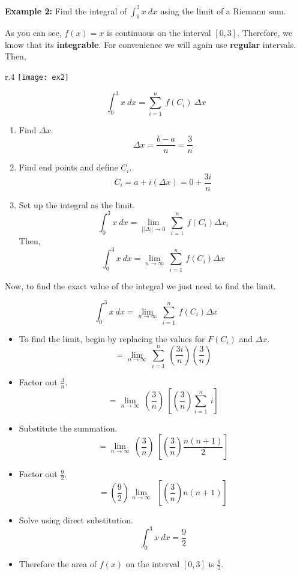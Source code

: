 \documentclass[12pt]{article}
\begin{document}
\bigskip

\noindent \color{myblue} \textbf{\large Example 2:} \color{black} Find the integral of $ \int_0^3 x \ dx $ using the limit of a Riemann sum.

\bigskip

As you can see, $f(x) = x$ is continuous on the interval $[0, 3]$. Therefore, we know that its \textbf{integrable}. For convenience we will again use \textbf{regular} intervals. Then,

\begin{wrapfigure}{r}{.4\textwidth}
\texttt{[image: ex2]}
\end{wrapfigure}


\color{mypink}
$$ \int_0^3 x \ dx = \sum_{i = 1}^n \ f(C_i) \ \Delta x$$ \color{black}

\begin{enumerate}
\item Find $\Delta x$. \color{mypink}
	$$\Delta x = \frac{b - a}{n} = \frac{3}{n}$$ \color{black}
\item Find end points and define $C_i$.\color{mypink}
	$$C_i = a + i(\Delta x) = 0 + \frac{3i}{n}$$ \color{black}
\item Set up the integral as the limit. \color{mypink}	
	$$\int_0^3 x \ dx = \lim_{||\Delta|| \to 0} \ \sum_{i=1}^n \ f(C_i) \Delta x_i$$
\color{black}Then, 
$$\int_0^3 x \ dx = \lim_{n \to \infty} \ \sum_{i=1}^n \ f(C_i) \Delta x$$
\end{enumerate}

Now, to find the exact value of the integral we just need to find the limit.

\newpage
$$\int_0^3 x \ dx 
= \lim_{n \to \infty} \ \sum_{i=1}^n \ f(C_i) \Delta x $$

\bigskip

\begin{itemize}
\item To find the limit, begin by replacing the values for $F(C_i)$ and $\Delta x$.\color{myblue}
$$ = \lim_{n \to \infty} \ \sum_{i=1}^n \ \left(\frac{3i}{n}\right) \left(\frac{3}{n}\right)$$ \color{black}

\item Factor out $\frac{3}{n}$.\color{myblue}
$$ = \lim_{n \to \infty} \ \left(\frac{3}{n}\right) \ \left[\left(\frac{3}{n}\right) \sum_{i=1}^n \ i\right]$$
\color{black}

\item Substitute the summation.\color{myblue}
$$= \lim_{n \to \infty} \ \left(\frac{3}{n}\right) \ \left[\left(\frac{3}{n}\right) \frac{n(n+1)}{2} \right]$$
\color{black}
\item Factor out $\frac{9}{2}$.\color{myblue}
$$= \left(\frac{9}{2}\right)\lim_{n \to \infty} \  \ \left[\left(\frac{3}{n}\right) n(n+1) \right]$$
\color{black}

\item Solve using direct substitution.\color{myblue}
$$ \int_0^3 x \ dx = \frac{9}{2} $$
\color{black}

\item Therefore the area of $f(x)$ on the interval $[0, 3]$ is $\displaystyle \frac{9}{2}$.

\end{itemize}
\end{document}
